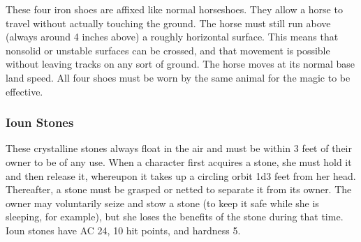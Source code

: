  These four iron shoes are affixed like normal horseshoes. They allow a horse to travel without actually touching the ground. The horse must still run above (always around 4 inches above) a roughly horizontal surface. This means that nonsolid or unstable surfaces can be crossed, and that movement is possible without leaving tracks on any sort of ground. The horse moves at its normal base land speed. All four shoes must be worn by the same animal for the magic to be effective.

\subsubsection{Ioun Stones} These crystalline stones always float in the air and must be within 3 feet of their owner to be of any use. When a character first acquires a stone, she must hold it and then release it, whereupon it takes up a circling orbit 1d3 feet from her head. Thereafter, a stone must be grasped or netted to separate it from its owner. The owner may voluntarily seize and stow a stone (to keep it safe while she is sleeping, for example), but she loses the benefits of the stone during that time. Ioun stones have AC 24, 10 hit points, and hardness 5.

